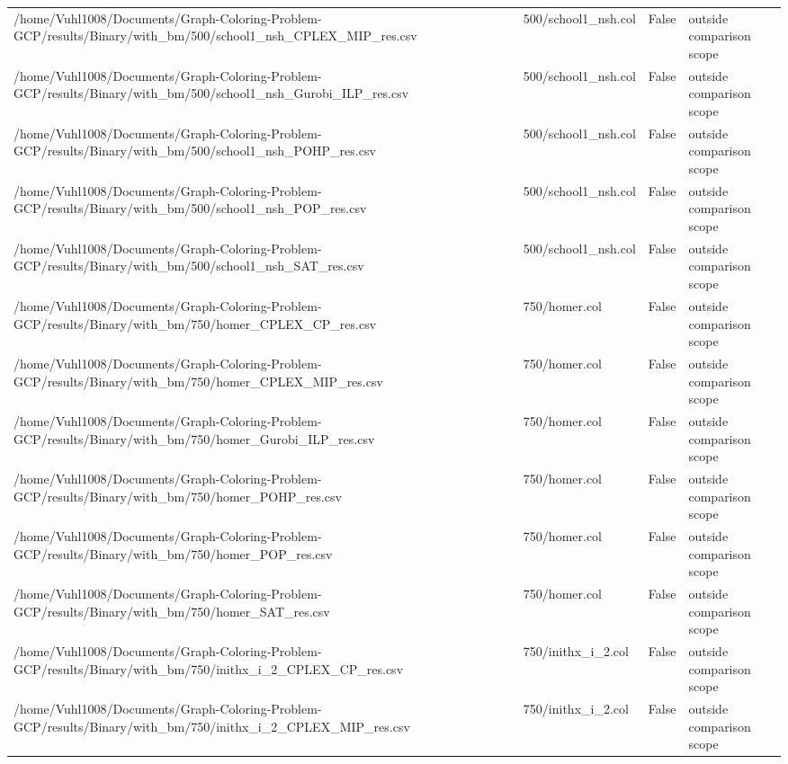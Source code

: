 \begin{table}[htbp]
\begin{tabular}{llll}
/home/Vuhl1008/Documents/Graph-Coloring-Problem-GCP/results/Binary/with\_bm/500/school1\_nsh\_CPLEX\_MIP\_res.csv & 500/school1\_nsh.col & False & outside comparison scope \\
/home/Vuhl1008/Documents/Graph-Coloring-Problem-GCP/results/Binary/with\_bm/500/school1\_nsh\_Gurobi\_ILP\_res.csv & 500/school1\_nsh.col & False & outside comparison scope \\
/home/Vuhl1008/Documents/Graph-Coloring-Problem-GCP/results/Binary/with\_bm/500/school1\_nsh\_POHP\_res.csv & 500/school1\_nsh.col & False & outside comparison scope \\
/home/Vuhl1008/Documents/Graph-Coloring-Problem-GCP/results/Binary/with\_bm/500/school1\_nsh\_POP\_res.csv & 500/school1\_nsh.col & False & outside comparison scope \\
/home/Vuhl1008/Documents/Graph-Coloring-Problem-GCP/results/Binary/with\_bm/500/school1\_nsh\_SAT\_res.csv & 500/school1\_nsh.col & False & outside comparison scope \\
/home/Vuhl1008/Documents/Graph-Coloring-Problem-GCP/results/Binary/with\_bm/750/homer\_CPLEX\_CP\_res.csv & 750/homer.col & False & outside comparison scope \\
/home/Vuhl1008/Documents/Graph-Coloring-Problem-GCP/results/Binary/with\_bm/750/homer\_CPLEX\_MIP\_res.csv & 750/homer.col & False & outside comparison scope \\
/home/Vuhl1008/Documents/Graph-Coloring-Problem-GCP/results/Binary/with\_bm/750/homer\_Gurobi\_ILP\_res.csv & 750/homer.col & False & outside comparison scope \\
/home/Vuhl1008/Documents/Graph-Coloring-Problem-GCP/results/Binary/with\_bm/750/homer\_POHP\_res.csv & 750/homer.col & False & outside comparison scope \\
/home/Vuhl1008/Documents/Graph-Coloring-Problem-GCP/results/Binary/with\_bm/750/homer\_POP\_res.csv & 750/homer.col & False & outside comparison scope \\
/home/Vuhl1008/Documents/Graph-Coloring-Problem-GCP/results/Binary/with\_bm/750/homer\_SAT\_res.csv & 750/homer.col & False & outside comparison scope \\
/home/Vuhl1008/Documents/Graph-Coloring-Problem-GCP/results/Binary/with\_bm/750/inithx\_i\_2\_CPLEX\_CP\_res.csv & 750/inithx\_i\_2.col & False & outside comparison scope \\
/home/Vuhl1008/Documents/Graph-Coloring-Problem-GCP/results/Binary/with\_bm/750/inithx\_i\_2\_CPLEX\_MIP\_res.csv & 750/inithx\_i\_2.col & False & outside comparison scope \\

\end{tabular}
\end{table}
